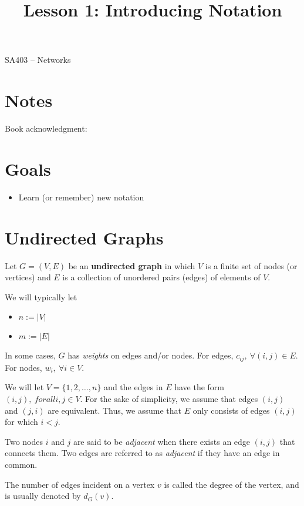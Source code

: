 \documentclass[12pt]{article}
\makeatletter
\theoremstyle{definition}
\newcommand{\graphbox}[5]%
{
\begin{tikzpicture}
     [>=latex,scale=#5]
     
     \draw [->,very thick] (#1, 0) -- (#2, 0) node[right] {$x$};
     \draw [->,very thick] (0, #3) -- (0, #4) node[above] {$y$};
     
     \draw[step=1cm,thick,dotted] (#1,#3) grid (#2,#4);
   \end{tikzpicture}
   }
\renewcommand{\maketitle}{
  \noindent SA403 -- Networks \\

  \begin{center}\Large{\textbf{\@title}}\end{center}
}
\makeatother
\begin{document}

\title{Lesson 1: Introducing Notation}


\maketitle


\section*{Notes}

Book acknowledgment:
\section*{Goals}
\begin{itemize}
\item  Learn (or remember) new notation
\end{itemize}

\section{Undirected Graphs}

Let $G = (V,E)$ be an \textbf{undirected graph} in which $V$ is a finite set of nodes (or vertices) and $E$ is a collection of unordered pairs (edges) of elements of $V$.

We will typically let	
\begin{itemize}
	\item $n:= |V|$
	\item $m:=|E|$
\end{itemize}

In some cases, $G$ has \emph{weights} on edges and/or nodes. For edges, $c_{ij}, \ \forall (i,j) \in E$. For nodes, $w_i, \ \forall i \in V$.

We will let $V= \{1,2, \dots, n\}$ and the edges in $E$ have the form $(i,j), \ forall i,j \in V$. For the sake of simplicity, we assume that edges $(i,j)$ and $(j,i)$ are equivalent. Thus, we assume that $E$ only consists of edges $(i,j)$ for which $i<j$.

Two nodes $i$ and $j$ are said to be \emph{adjacent} when there exists an edge $(i,j)$ that connects them. Two edges are referred to as \emph{adjacent} if they have an edge in common.

The number of edges incident on a vertex $v$ is called the degree of the vertex, and is usually denoted by $d_G(v)$. 
\end{document}
